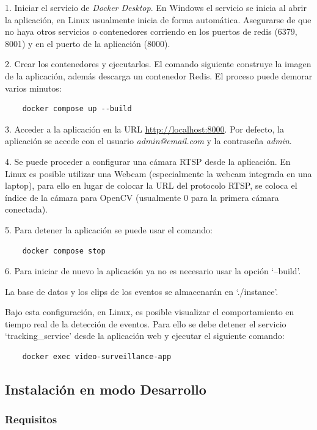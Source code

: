 \documentclass[11pt,a4paper]{article}
\begin{document}
1. Iniciar el servicio de \textit{Docker Desktop}. En Windows el servicio se inicia al abrir la aplicación, en Linux usualmente inicia de forma automática. Asegurarse de que no haya otros servicios o contenedores corriendo en los puertos de redis (6379, 8001) y en el puerto de la aplicación (8000).

2. Crear los contenedores y ejecutarlos. El comando siguiente construye la imagen de la aplicación, además descarga un contenedor Redis. El proceso puede demorar varios minutos:

\begin{verbatim}
    docker compose up --build
\end{verbatim}

3. Acceder a la aplicación en la URL \url{http://localhost:8000}. Por defecto, la aplicación se accede con el usuario \textit{admin@email.com} y la contraseña \textit{admin}.

4. Se puede proceder a configurar una cámara RTSP desde la aplicación. En Linux es posible utilizar una Webcam (especialmente la webcam integrada en una laptop), para ello en lugar de colocar la URL del protocolo RTSP, se coloca el índice de la cámara para OpenCV (usualmente 0 para la primera cámara conectada).

5. Para detener la aplicación se puede usar el comando:

\begin{verbatim}
    docker compose stop
\end{verbatim}

6. Para iniciar de nuevo la aplicación ya no es necesario usar la opción `--build'.

La base de datos y los clips de los eventos se almacenarán en `./instance'.

Bajo esta configuración, en Linux, es posible visualizar el comportamiento en tiempo real de la detección de eventos. Para ello se debe detener el servicio `tracking\_service' desde la aplicación web y ejecutar el siguiente comando:

\begin{verbatim}
    docker exec video-surveillance-app
\end{verbatim}

\subsection{Instalación en modo Desarrollo}

\subsubsection{Requisitos}
\end{document}
